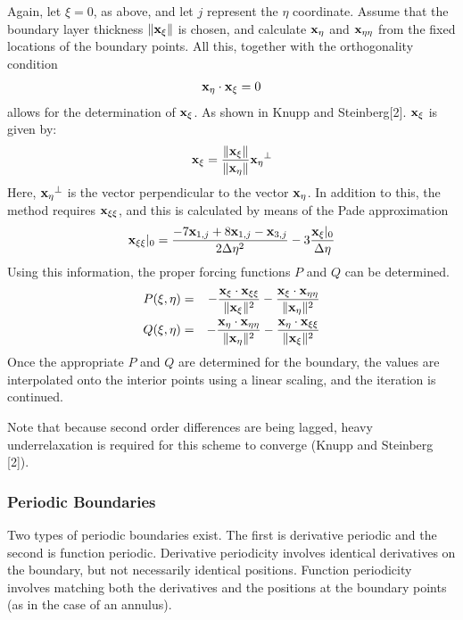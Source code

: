 Again, let $\xi=0$, as above, and let $j$ represent the $\eta$ coordinate.
Assume that the boundary layer thickness $\|\mathord{\mathbf{x}}_{\xi}\|$ is chosen,
and calculate ${\mathord{\mathbf{x}}_{\eta}}$ and ${\mathord{\mathbf{x}}_{\eta\eta}}$ from
the fixed locations of the boundary points.  
All this, together with the orthogonality condition
\begin{eqnarray*}
{\mathord{\mathbf{x}}}_{\eta}\cdot{\mathord{\mathbf{x}}}_{\xi} = 0    
\end{eqnarray*}
allows for the determination of $\mathord{\mathbf{x}}_{\xi}$.  As shown in Knupp and Steinberg[2].  
$\mathord{\mathbf{x}}_{\xi}$ is given by:
\begin{eqnarray}
\mathord{\mathbf{x}}_{\xi}=\frac{\|\mathord{\mathbf{x}}_{\xi}\|}{\|\mathord{\mathbf{x}}_{\eta}\|}{\mathord{\mathbf{x}}_{\eta}}^{\perp}
\end{eqnarray}
Here, ${\mathord{\mathbf{x}}_{\eta}}^{\perp}$ is the vector perpendicular to the vector ${\mathord{\mathbf{x}}_{\eta}}$.  
In addition to this, the method requires $\mathord{\mathbf{x}}_{\xi\xi}$, and this is calculated by means of the Pade
approximation 
\begin{eqnarray}
\mathord{\mathbf{x}}_{\xi\xi}|_0=\frac{-7\mathord{\mathbf{x}}_{1,j}+8\mathord{\mathbf{x}}_{1,j}-\mathord{\mathbf{x}}_{3,j}}{2\Delta\eta^2}-3\frac{\mathord{\mathbf{x}}_{\xi}|_0}{\Delta\eta}
\end{eqnarray}
Using this information, the proper forcing functions $P$ and $Q$ can be determined.
\begin{eqnarray*}
P(\xi,\eta)&=&-\frac{\mathord{\mathbf{x}}_\xi\cdot\mathord{\mathbf{x}}_{\xi\xi}}{\|\mathord{\mathbf{x}}_\xi\|^2}-\frac{\mathord{\mathbf{x}}_\xi\cdot\mathord{\mathbf{x}}_{\eta\eta}}{\|\mathord{\mathbf{x}}_\eta\|^2} \\
Q(\xi,\eta)&=&-\frac{\mathord{\mathbf{x}}_\eta\cdot\mathord{\mathbf{x}}_{\eta\eta}}{\|\mathord{\mathbf{x}}_\eta\|^2}-\frac{\mathord{\mathbf{x}}_\eta\cdot\mathord{\mathbf{x}}_{\xi\xi}}{\|\mathord{\mathbf{x}}_\xi\|^2}
\end{eqnarray*}
Once the appropriate $P$ and $Q$ are determined for the boundary, the values are interpolated onto
the interior points using a linear scaling, and the iteration is continued.

Note that because second order differences are being lagged, heavy underrelaxation is 
required for this scheme to converge (Knupp and Steinberg [2]).  

\subsubsection{Periodic Boundaries}

Two types of periodic boundaries exist.  The first is derivative periodic and the second
is function periodic.  Derivative periodicity involves identical derivatives on the 
boundary, but not necessarily identical positions.  Function periodicity involves
matching both the derivatives and the positions at the boundary points (as in the case of an
annulus).

